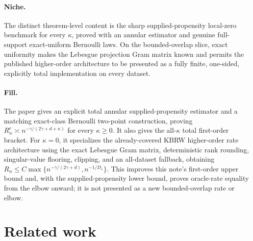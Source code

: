 \documentclass{article}
\begin{document}
\paragraph{Niche.} The distinct theorem-level content is the sharp supplied-propensity local-zero benchmark for every \(\kappa\), proved with an annular estimator and genuine full-support exact-uniform Bernoulli laws.  On the bounded-overlap slice, exact uniformity makes the Lebesgue projection Gram matrix known and permits the published higher-order architecture to be presented as a fully finite, one-sided, explicitly total implementation on every dataset.

\paragraph{Fill.} The paper gives an explicit total annular supplied-propensity estimator and a matching exact-class Bernoulli two-point construction, proving \(R_n^e\asymp n^{-\gamma/(2\gamma+d+\kappa)}\) for every \(\kappa\geq0\).  It also gives the all-\(\kappa\) total first-order bracket.  For \(\kappa=0\), it specializes the already-covered KBRW higher-order rate architecture using the exact Lebesgue Gram matrix, deterministic rank rounding, singular-value flooring, clipping, and an all-dataset fallback, obtaining \(R_n\leq C\max\{n^{-\gamma/(2\gamma+d)},n^{-1/D_\star}\}\).  This improves this note's first-order upper bound and, with the supplied-propensity lower bound, proves oracle-rate equality from the elbow onward; it is not presented as a new bounded-overlap rate or elbow.

\section{Related work}
\end{document}
